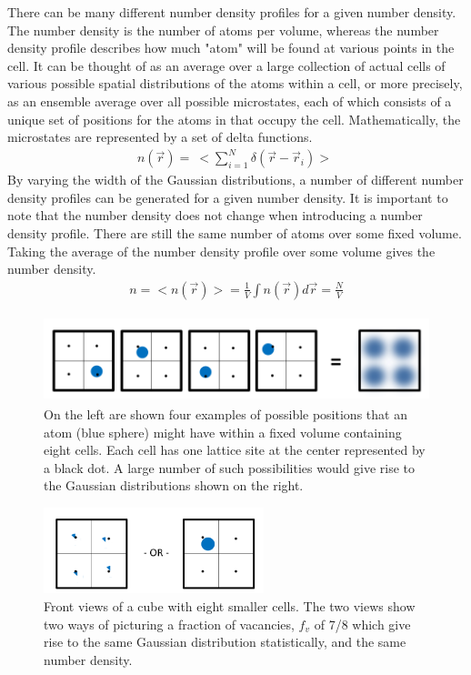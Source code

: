 \documentclass[double,12pt]{beavtex}
\begin{document}
There can be many different number density profiles for a given number
density. The number density is the number of atoms per volume, whereas
the number density profile describes how much "atom" will be found at various 
points in the cell. 
It can be thought of as an average over a large collection of actual cells
of various possible spatial distributions of the atoms within a cell, or
more precisely, as an ensemble average over all possible microstates, 
each of which consists of a unique set of positions for the atoms in 
that occupy the cell. Mathematically, the microstates are represented 
by a set of delta functions.
\begin{align}
    n(\vec r)=~<\sum_{i=1}^N\delta(\vec r - \vec r_i)>~
\end{align} 
By varying the width of the Gaussian distributions, a number of different 
number density profiles can be generated for a given number density.
It is important to note that the number density does not change when 
introducing a number density profile.  
There are still the same number of atoms over some fixed volume. 
Taking the average of the number density profile over some volume 
gives the number density. 
\begin{align}
    n=<n(\vec{r})>=\frac{1}{V}\int{n(\vec{r})}{d\vec{r}}=\frac{N}{V}
\end{align}

\begin{figure}
   \centering
   \includegraphics[height=2.5cm]{Ensemble_Smallcells.png}
   \caption{On the left are shown four examples of possible positions 
   that an atom (blue sphere) might have within a fixed volume 
   containing eight cells. Each cell has one lattice site at the center 
   represented by a black dot. A large number of such possibilities 
   would give rise to the Gaussian distributions shown on the right.}
   \label{fig:Ensemble_Smallcells}
\end{figure} 

\begin{figure}
   \centering
   \includegraphics[height=2.5cm]{SameStatPic.png}
   \caption{Front views of a cube with eight smaller cells. The two views 
   show two ways of picturing a fraction of vacancies, $f_v$ of 7/8 which 
   give rise to the same Gaussian distribution statistically, 
   and the same number density.}
   \label{fig:SameStatPic}
\end{figure} 
\end{document}
